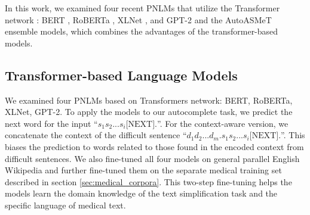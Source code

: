 \documentclass[11pt]{article}
\newcommand{\todo}[1]{\textcolor{red}{TODO: #1}}
\begin{document}
\begin{table}
\centering
{}
\caption{The resulting prediction tasks that are generated from the example in Table \ref{tab:testexample}. \todo{AHMAD: after you finished Medical Corpora part, please fix this table with a medical example.}}
\label{fig:testing}
\end{table}

In this work, we examined four recent PNLMs that utilize the Transformer network \cite{vaswani2017attention}: BERT \cite{devlin2018bert}, RoBERTa \cite{liu2019roberta}, XLNet \cite{yang2019xlnet}, and GPT-2 \cite{radford2019language} and the AutoASMeT ensemble models, which combines the advantages of the transformer-based models.

\subsection{Transformer-based Language Models}


We examined four PNLMs based on Transformers network: BERT, RoBERTa, XLNet, GPT-2. To apply the models to our autocomplete task, we predict the next word for the input ``$s_1 s_2 ... s_i \mbox{[NEXT]} .$''. For the context-aware version, we concatenate the context of the difficult sentence
``$d_1 d_2 ... d_m. s_1 s_2 ... s_i \mbox{[NEXT]} .$''. This biases the prediction to words related to those found in the encoded context from difficult sentences. We also fine-tuned all four models on general parallel English Wikipedia \cite{kauchak2013improving} and further fine-tuned them on the separate medical training set described in section \ref{sec:medical_corpora}. This two-step fine-tuning helps the models learn the domain knowledge of the text simplification task and the specific language of medical text.
\end{document}
